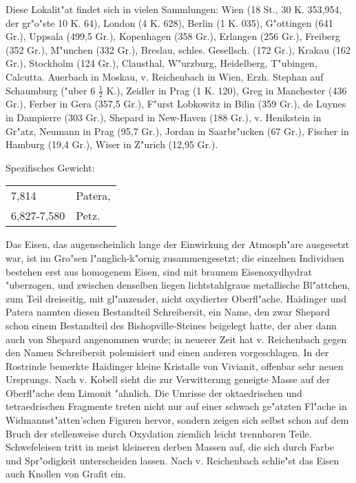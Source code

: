 \documentclass[a4paper, 11pt, oneside]{article}
\begin{document}
Diese Lokalit"at findet sich in vielen Sammlungen: Wien (18 St., 30 K. 353,954, der gr"o"ste 10 K. 64), London (4 K. 628), Berlin (1 K. 035), G"ottingen (641 Gr.), Uppsala (499,5 Gr.), Kopenhagen (358 Gr.), Erlangen (256 Gr.), Freiberg (352 Gr.), M"unchen (332 Gr.), Breslau, schles. Gesellsch. (172 Gr.), Krakau (162 Gr.), Stockholm (124 Gr.), Clausthal, W"urzburg, Heidelberg, T"ubingen, Calcutta. Auerbach in Moskau, v. Reichenbach in Wien, Erzh. Stephan auf Schaumburg ("uber 6 $\frac{1}{2}$ K.), Zeidler in Prag (1 K. 120), Greg in Manchester (436 Gr.), Ferber in Gera (357,5 Gr.), F"urst Lobkowitz in Bilin (359 Gr.), de Luynes in Dampierre (303 Gr.), Shepard in New-Haven (188 Gr.), v. Henikstein in Gr"atz, Neumann in Prag (95,7 Gr.), Jordan in Saarbr"ucken (67 Gr.), Fischer in Hamburg (19,4 Gr.), Wiser in Z"urich (12,95 Gr.).

Spezifisches Gewicht:  
\begin{table}[!ht]
    \centering
    \begin{tabular}{l l}
        7,814 & Patera,\\
        6,827-7,580 & Petz.
    \end{tabular}
\end{table}

Das Eisen, das augenscheinlich lange der Einwirkung der Atmosph"are ausgesetzt war, ist im Gro"sen l"anglich-k"ornig zusammengesetzt; die einzelnen Individuen bestehen erst aus homogenem Eisen, sind mit braunem Eisenoxydhydrat "uberzogen, und zwischen denselben liegen lichtstahlgraue metallische Bl"attchen, zum Teil dreiseitig, mit gl"anzender, nicht oxydierter Oberfl"ache. Haidinger und Patera nannten diesen Bestandteil Schreibersit, ein Name, den zwar Shepard schon einem Bestandteil des Bishopville-Steines beigelegt hatte, der aber dann auch von Shepard angenommen wurde; in neuerer Zeit hat v. Reichenbach gegen den Namen Schreibersit polemisiert und einen anderen vorgeschlagen. In der Rostrinde bemerkte Haidinger kleine Kristalle von Vivianit, offenbar sehr neuen Ursprungs. Nach v. Kobell sieht die zur Verwitterung geneigte Masse auf der Oberfl"ache dem Limonit "ahnlich. Die Umrisse der oktaedrischen und tetraedrischen Fragmente treten nicht nur auf einer schwach ge"atzten Fl"ache in Widmannst"atten'schen Figuren hervor, sondern zeigen sich selbst schon auf dem Bruch der stellenweise durch Oxydation ziemlich leicht trennbaren Teile. Schwefeleisen tritt in meist kleineren derben Massen auf, die sich durch Farbe und Spr"odigkeit unterscheiden lassen. Nach v. Reichenbach schlie"st das Eisen auch Knollen von Grafit ein.
\end{document}
